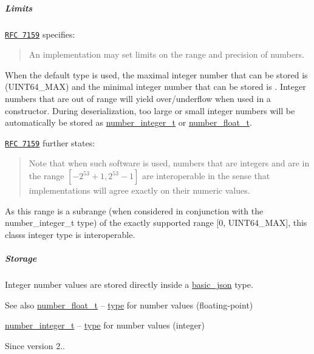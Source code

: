 \subparagraph*{Limits}

\href{http://rfc7159.net/rfc7159}{\tt R\+FC 7159} specifies\+: \begin{quote}
An implementation may set limits on the range and precision of numbers. \end{quote}


When the default type is used, the maximal integer number that can be stored is {} (U\+I\+N\+T64\+\_\+\+M\+AX) and the minimal integer number that can be stored is {}. Integer numbers that are out of range will yield over/underflow when used in a constructor. During deserialization, too large or small integer numbers will be automatically be stored as \hyperlink{classnlohmann_1_1basic__json_a98e611d67b7bd75307de99c9358ab2dc}{number\+\_\+integer\+\_\+t} or \hyperlink{classnlohmann_1_1basic__json_a88d6103cb3620410b35200ee8e313d97}{number\+\_\+float\+\_\+t}.

\href{http://rfc7159.net/rfc7159}{\tt R\+FC 7159} further states\+: \begin{quote}
Note that when such software is used, numbers that are integers and are in the range $[-2^{53}+1, 2^{53}-1]$ are interoperable in the sense that implementations will agree exactly on their numeric values. \end{quote}


As this range is a subrange (when considered in conjunction with the number\+\_\+integer\+\_\+t type) of the exactly supported range \mbox{[}0, U\+I\+N\+T64\+\_\+\+M\+AX\mbox{]}, this class\textquotesingle{}s integer type is interoperable.

\subparagraph*{Storage}

Integer number values are stored directly inside a \hyperlink{classnlohmann_1_1basic__json}{basic\+\_\+json} type.

\begin{DoxySeeAlso}{See also}
\hyperlink{classnlohmann_1_1basic__json_a88d6103cb3620410b35200ee8e313d97}{number\+\_\+float\+\_\+t} -- \hyperlink{classnlohmann_1_1basic__json_a2b2d781d7f2a4ee41bc0016e931cadf7}{type} for number values (floating-\/point) 

\hyperlink{classnlohmann_1_1basic__json_a98e611d67b7bd75307de99c9358ab2dc}{number\+\_\+integer\+\_\+t} -- \hyperlink{classnlohmann_1_1basic__json_a2b2d781d7f2a4ee41bc0016e931cadf7}{type} for number values (integer)
\end{DoxySeeAlso}
\begin{DoxySince}{Since}
version 2.. 
\end{DoxySince}

